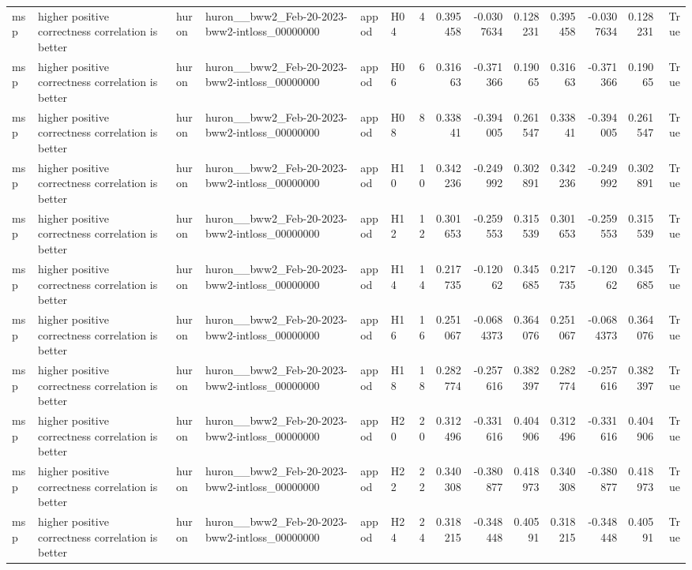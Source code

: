 \begin{longtable}{llllllrrrrrrrr}
msp & higher positive correctness correlation is better & huron & huron\_\_bww2\_Feb-20-2023-bww2-intloss\_00000000 & appod & H04 & 4 & 0.395458 & -0.0307634 & 0.128231 & 0.395458 & -0.0307634 & 0.128231 & True \\
msp & higher positive correctness correlation is better & huron & huron\_\_bww2\_Feb-20-2023-bww2-intloss\_00000000 & appod & H06 & 6 & 0.31663 & -0.371366 & 0.19065 & 0.31663 & -0.371366 & 0.19065 & True \\
msp & higher positive correctness correlation is better & huron & huron\_\_bww2\_Feb-20-2023-bww2-intloss\_00000000 & appod & H08 & 8 & 0.33841 & -0.394005 & 0.261547 & 0.33841 & -0.394005 & 0.261547 & True \\
msp & higher positive correctness correlation is better & huron & huron\_\_bww2\_Feb-20-2023-bww2-intloss\_00000000 & appod & H10 & 10 & 0.342236 & -0.249992 & 0.302891 & 0.342236 & -0.249992 & 0.302891 & True \\
msp & higher positive correctness correlation is better & huron & huron\_\_bww2\_Feb-20-2023-bww2-intloss\_00000000 & appod & H12 & 12 & 0.301653 & -0.259553 & 0.315539 & 0.301653 & -0.259553 & 0.315539 & True \\
msp & higher positive correctness correlation is better & huron & huron\_\_bww2\_Feb-20-2023-bww2-intloss\_00000000 & appod & H14 & 14 & 0.217735 & -0.12062 & 0.345685 & 0.217735 & -0.12062 & 0.345685 & True \\
msp & higher positive correctness correlation is better & huron & huron\_\_bww2\_Feb-20-2023-bww2-intloss\_00000000 & appod & H16 & 16 & 0.251067 & -0.0684373 & 0.364076 & 0.251067 & -0.0684373 & 0.364076 & True \\
msp & higher positive correctness correlation is better & huron & huron\_\_bww2\_Feb-20-2023-bww2-intloss\_00000000 & appod & H18 & 18 & 0.282774 & -0.257616 & 0.382397 & 0.282774 & -0.257616 & 0.382397 & True \\
msp & higher positive correctness correlation is better & huron & huron\_\_bww2\_Feb-20-2023-bww2-intloss\_00000000 & appod & H20 & 20 & 0.312496 & -0.331616 & 0.404906 & 0.312496 & -0.331616 & 0.404906 & True \\
msp & higher positive correctness correlation is better & huron & huron\_\_bww2\_Feb-20-2023-bww2-intloss\_00000000 & appod & H22 & 22 & 0.340308 & -0.380877 & 0.418973 & 0.340308 & -0.380877 & 0.418973 & True \\
msp & higher positive correctness correlation is better & huron & huron\_\_bww2\_Feb-20-2023-bww2-intloss\_00000000 & appod & H24 & 24 & 0.318215 & -0.348448 & 0.40591 & 0.318215 & -0.348448 & 0.40591 & True \\

\end{longtable}
